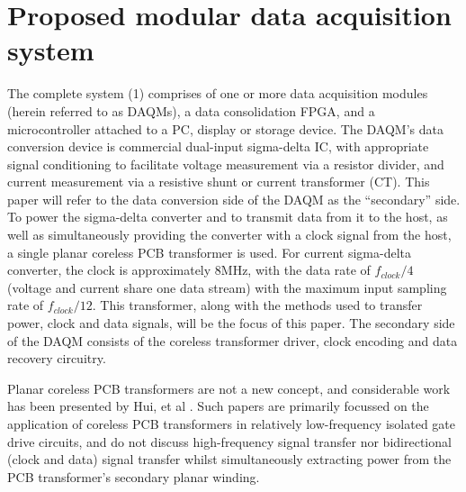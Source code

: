 \documentclass[conference]{IEEEtran}
\begin{document}

\section{Proposed modular data acquisition system}

The complete system (\figurename{1}) comprises of one or more data acquisition modules (herein referred to as DAQMs), a data consolidation FPGA, and a microcontroller attached to a PC, display or storage device.  
The DAQM's data conversion device is commercial dual-input sigma-delta IC, with appropriate signal conditioning to facilitate voltage measurement via a resistor divider, and current measurement via a resistive shunt or current transformer (CT).  This paper will refer to the data conversion side of the DAQM as the ``secondary'' side.  To power the sigma-delta converter and to transmit data from it to the host, as well as simultaneously providing the converter with a clock signal from the host, a single planar coreless PCB transformer is used.  For current sigma-delta converter, the clock is approximately 8MHz, with the data rate of $ f_{clock}/4 $ (voltage and current share one data stream) with the maximum input sampling rate of $ f_{clock}/12 $.
This transformer, along with the methods used to transfer power, clock and data signals, will be the focus of this paper.  The secondary side of the DAQM consists of the coreless transformer driver, clock encoding and data recovery circuitry.  

Planar coreless PCB transformers are not a new concept, and considerable work has been presented by Hui, et al \cite{TangHuiFundamental}.  Such papers are primarily focussed on the application of coreless PCB transformers in relatively low-frequency isolated gate drive circuits, and do not discuss high-frequency signal transfer nor bidirectional (clock and data) signal transfer whilst simultaneously extracting power from the PCB transformer's secondary planar winding.
\end{document}
